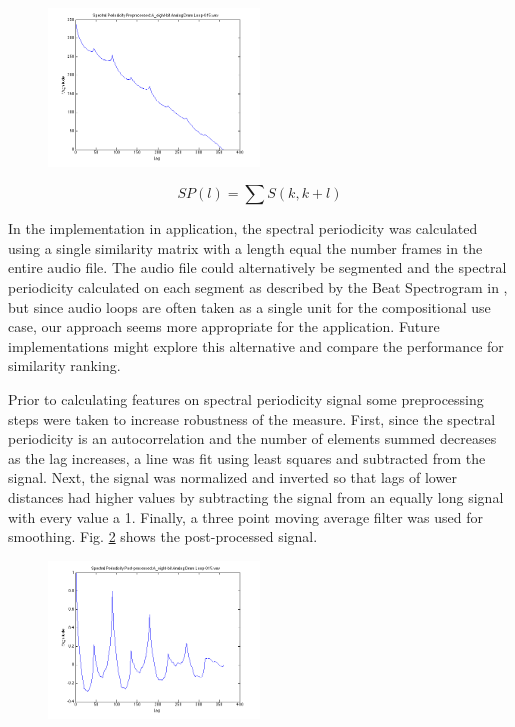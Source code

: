 \documentclass{article}
\begin{document}
\begin{figure}[h!]
	
  \centering
    \includegraphics[width=0.5\textwidth]{bs_pre.png}
      \caption{}\label{fig:bs1_pre}
\end{figure}

\begin{equation}
\label{eq:bs}
SP(l) = \sum S(k, k+l)
\end{equation}

In the implementation in application, the spectral periodicity was calculated using a single similarity matrix with a length equal the number frames in the entire audio file. The audio file could alternatively be segmented and the spectral periodicity calculated on each segment as described by the Beat Spectrogram in \cite{foote2001beat}, but since audio loops are often taken as a single unit for the compositional use case, our approach seems more appropriate for the application. Future implementations might explore this alternative and compare the performance for similarity ranking.

Prior to calculating features on spectral periodicity signal some preprocessing steps were taken to increase robustness of the measure. First, since the spectral periodicity is an autocorrelation and the number of elements summed decreases as the lag increases, a line was fit using least squares and subtracted from the signal. Next, the signal was normalized and inverted so that lags of lower distances had higher values by subtracting the signal from an equally long signal with every value a 1. Finally, a three point moving average filter was used for smoothing. Fig. \ref{fig:bs1_post} shows the post-processed signal.

\begin{figure}[h!]
  \centering
    \includegraphics[width=0.5\textwidth]{bs_post.png}
      \caption{}	\label{fig:bs1_post}
\end{figure}
\end{document}
